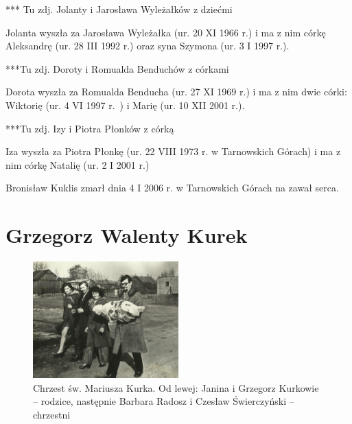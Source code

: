 {\color{red}
*** Tu zdj. Jolanty i Jarosława Wyleżałków z dziećmi}


Jolanta wyszła za Jarosława Wyleżałka (ur. 20 XI 1966 r.) i ma z nim córkę Aleksandrę (ur. 28 III 1992 r.) oraz syna Szymona (ur. 3 I 1997 r.).

{\color{red}
***Tu zdj. Doroty i Romualda Benduchów z córkami}

Dorota wyszła za Romualda Benducha (ur. 27 XI 1969 r.) i ma z nim dwie córki: Wiktorię (ur. 4 VI 1997 r.~) i Marię (ur. 10 XII 2001 r.).

{\color{red}
***Tu zdj. Izy i Piotra Płonków z córką}

Iza wyszła za Piotra Płonkę (ur. 22 VIII 1973 r. w Tarnowskich Górach) i ma z nim córkę Natalię (ur. 2 I 2001 r.)

Bronisław Kuklis zmarł dnia 4 I 2006 r. w Tarnowskich Górach na zawał serca.




\section{Grzegorz Walenty Kurek}

\begin{figure}[!hb]
\begin{center}
\includegraphics[width=0.5\textwidth]{zdjecia/chrzest_mariusza_kurka.jpg}
\caption[Chrzest św. Mariusza Kurka]{Chrzest św. Mariusza Kurka. Od lewej: Janina i Grzegorz Kurkowie -- rodzice, następnie Barbara Radosz i Czesław Świerczyński -- chrzestni}
\label{rys:chrzest_mariusza_kurka}
\end{center}
\end{figure}

